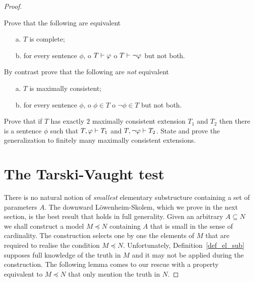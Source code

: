 \begin{proof}
\begin{exercise}\label{ex_max_cons_compl}
Prove that the following are equivalent
\begin{itemize}
\item[a.] $T$ is complete;
\item[b.] for every sentence $\phi$, o $T\vdash\varphi$ o  $T\vdash\neg\varphi$ but not both.
\end{itemize}
By contrast prove that the following are \textit{not\/} equivalent
\begin{itemize}
\item[a.] $T$ is maximally consistent;
\item[b.] for every sentence $\phi$, o $\phi\in T$ o  $\neg\phi\in T$ but not both.
\end{itemize}
\end{exercise}

\begin{exercise}\label{ex_2max_cons_ext}
Prove that if $T$ has exactly $2$ maximally consistent extension $T_1$ and $T_2$ then there is a sentence $\phi$ such that $T,\varphi\vdash T_1$ and $T,\neg\varphi\vdash T_2$.
State and prove the generalization to finitely many maximally consistent extensions.
\end{exercise} 




\section{The Tarski-Vaught test}

There is no natural notion of \textit{smallest\/} elementary substructure containing a set of parameters $A$.
The downward L\"owenheim-Skolem, which we prove in the next section, is the best result that holds in full generality.
Given an arbitrary $A\subseteq N$ we shall construct a model $M\preceq N$ containing $A$ that is small in the sense of cardinality.
The construction selects one by one the elements of $M$ that are required to realise the condition $M\preceq N$.
Unfortunately, Definition~\ref{def_el_sub} supposes full knowledge of the truth in $M$ and it may not be applied during the construction.
The following lemma comes to our rescue with a property equivalent to $M\preceq N$ that only mention the truth in $N$.


\end{proof}
